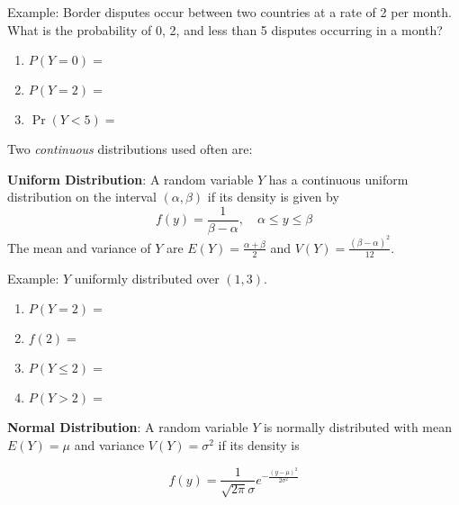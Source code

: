 \documentclass[]{book}
\theoremstyle{definition}
\theoremstyle{definition}
\theoremstyle{definition}
\theoremstyle{remark}
\begin{document}
\begin{framed}
Example: Border disputes occur between two countries at a rate of 2 per month.  What is the probability of 0, 2, and less than 5 disputes occurring in a month?\\
\parbox[c]{4.25in}{
  \begin{enumerate}
  \item $P(Y=0)=$ 
  \item $P(Y=2)=$ 
  \item $\Pr(Y<5)=$ 
  \end{enumerate}}
 \begin{comment}
 \parbox{1.5in}{\hfill \epsffile{poispmf.eps}}
 \end{comment}
\end{framed}

Two \emph{continuous} distributions used often are:

\textbf{Uniform Distribution}: A random variable \(Y\) has a continuous
uniform distribution on the interval \((\alpha,\beta)\) if its density
is given by \[f(y)=\frac{1}{\beta-\alpha}, \quad \alpha\le y\le \beta\]
The mean and variance of \(Y\) are \(E(Y)=\frac{\alpha+\beta}{2}\) and
\(V(Y)=\frac{(\beta-\alpha)^2}{12}\).

\begin{framed}
Example: $Y$ uniformly distributed over $(1,3)$.\\
 \parbox[c]{4.25in}{
 \begin{enumerate}
 \item $P(Y=2) = $
 \item $f(2) = $
 \item $P(Y\le 2) = $
 \item $P(Y > 2) =$
\end{enumerate}}
\begin{comment}
\parbox{1.5in}{\hfill \epsffile{unifpdf.eps}}
\end{comment}
\end{framed}

\textbf{Normal Distribution}: A random variable \(Y\) is normally
distributed with mean \(E(Y)=\mu\) and variance \(V(Y)=\sigma^2\) if its
density is

\[f(y)=\frac{1}{\sqrt{2\pi}\sigma}e^{-\frac{(y-\mu)^2}{2\sigma^2}}\]

\begin{comment}
\parbox[c]{4.25in}{Example: $Y$ normally distributed with mean $\mu=0$ and variance $\sigma^2=.1$}
\parbox{1.5in}{\hfill \epsffile{normpdf.eps}}
\end{comment}
\end{document}
